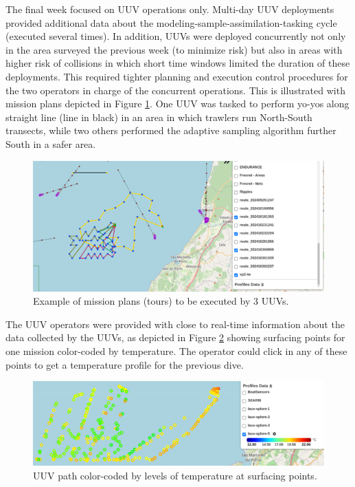 The final week focused on UUV operations only. Multi-day UUV deployments provided additional data about the modeling-sample-assimilation-tasking cycle (executed several times). In addition, UUVs were deployed concurrently not only in the area surveyed the previous week (to minimize risk) but also in areas with higher risk of collisions in which short time windows limited the duration of these deployments. This required tighter planning and execution control procedures for the two operators in charge of the concurrent operations. This is illustrated with mission plans depicted in Figure \ref{fig:missionplans}. One UUV was tasked to perform yo-yos along straight line (line in black) in an area in which trawlers run North-South transects, while two others performed the adaptive sampling algorithm further South in a safer area.
 
\begin{figure}
    \centering
    \includegraphics[width=.7\linewidth]{fig/missionplans.png}
    \caption{Example of mission plans (tours) to be executed by 3 UUVs.}
    \label{fig:missionplans}
\end{figure}


The UUV operators were provided with close to real-time information about the data collected by the UUVs, as depicted in Figure \ref{fig:temperatureprofiles} showing surfacing points for one mission color-coded by temperature. The operator could click in any of these points to get a temperature profile for the previous dive.

 \begin{figure}
    \centering
    \includegraphics[width=.7\linewidth]{fig/temperatureprofiles.png}
    \caption{UUV path color-coded by levels of temperature at surfacing points.}
    \label{fig:temperatureprofiles}
\end{figure}



